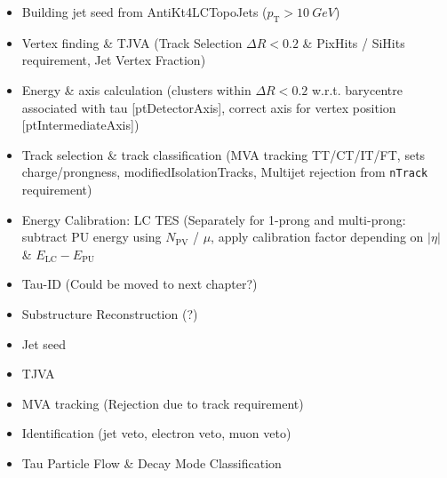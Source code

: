 \begin{itemize}
\item Building jet seed from AntiKt4LCTopoJets ($p_\mathrm{T} > \SI{10}{GeV}$)

\item Vertex finding \& TJVA (Track Selection $\Delta R < 0.2$ \& PixHits /
  SiHits requirement, Jet Vertex Fraction)

\item Energy \& axis calculation (clusters within $\Delta R < 0.2$ w.r.t.
  barycentre associated with tau [ptDetectorAxis], correct axis for vertex
  position [ptIntermediateAxis])

\item Track selection \& track classification (MVA tracking TT/CT/IT/FT, sets
  charge/prongness, modifiedIsolationTracks, Multijet rejection from
  \texttt{nTrack} requirement)

\item Energy Calibration: LC \textrightarrow TES (Separately for 1-prong and
  multi-prong: subtract PU energy using $N_\mathrm{PV}$ / $\mu$, apply
  calibration factor depending on $|\eta|$ \& $E_\mathrm{LC} - E_\mathrm{PU}$

\item Tau-ID (Could be moved to next chapter?)

\item Substructure Reconstruction (?)
\end{itemize}


\begin{itemize}
\item Jet seed
\item TJVA
\item MVA tracking (Rejection due to track requirement)
\item Identification (jet veto, electron veto, muon veto)
\item Tau Particle Flow \& Decay Mode Classification
\end{itemize}

\cite{atlas:taurec:run1}
\cite{atlas:taurec:run2}
\cite{atlas:taurec:decaymodes}

